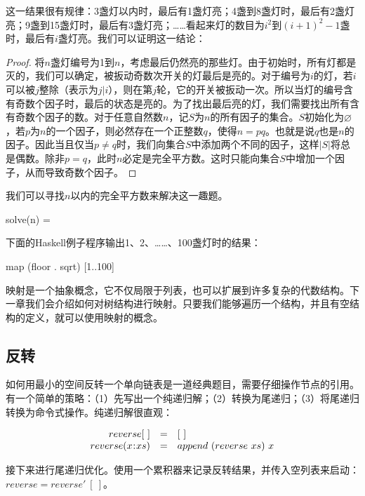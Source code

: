 \documentclass[b5paper]{ctexart}
\begin{document}
这一结果很有规律：3盏灯以内时，最后有1盏灯亮；4盏到8盏灯时，最后有2盏灯亮；9盏到15盏灯时，最后有3盏灯亮；……看起来灯的数目为$i^2$到$(i+1)^2-1$盏时，最后有$i$盏灯亮。我们可以证明这一结论：

\begin{proof}
将$n$盏灯编号为1到$n$，考虑最后仍然亮的那些灯。由于初始时，所有灯都是灭的，我们可以确定，被扳动奇数次开关的灯最后是亮的。对于编号为$i$的灯，若$i$可以被$j$整除（表示为$j | i$），则在第$j$轮，它的开关被扳动一次。所以当灯的编号含有奇数个因子时，最后的状态是亮的。为了找出最后亮的灯，我们需要找出所有含有奇数个因子的数。对于任意自然数$n$，记$S$为$n$的所有因子的集合。$S$初始化为$\varnothing$，若$p$为$n$的一个因子，则必然存在一个正整数$q$，使得$n = p q$。也就是说$q$也是$n$的因子。因此当且仅当$p \neq q$时，我们向集合$S$中添加两个不同的因子，这样$|S|$将总是偶数。除非$p = q$，此时$n$必定是完全平方数。这时只能向集合$S$中增加一个因子，从而导致奇数个因子。
\end{proof}

我们可以寻找$n$以内的完全平方数来解决这一趣题。

\be
solve(n) = \lfloor {} \rfloor
\ee

下面的Haskell例子程序输出1、2、……、100盏灯时的结果：

\begin{Haskell}
map (floor . sqrt) [1..100]
\end{Haskell}

映射是一个抽象概念，它不仅局限于列表，也可以扩展到许多复杂的代数结构。下一章我们会介绍如何对树结构进行映射。只要我们能够遍历一个结构，并且有空结构的定义，就可以使用映射的概念。

\subsection{反转}
 \label{sec:reverse}

如何用最小的空间反转一个单向链表是一道经典题目，需要仔细操作节点的引用。有一个简单的策略：（1）先写出一个纯递归解；（2）转换为尾递归；（3）将尾递归转换为命令式操作。纯递归解很直观：

\[
\begin{array}{rcl}
reverse [\ ] & = & [\ ] \\
reverse (x \mathbin{\!:\!} xs) & = & append\ (reverse\ xs)\ x \\
\end{array}
\]

接下来进行尾递归优化。使用一个累积器来记录反转结果，并传入空列表来启动：$reverse = reverse'\ [\ ]$。
\end{document}
